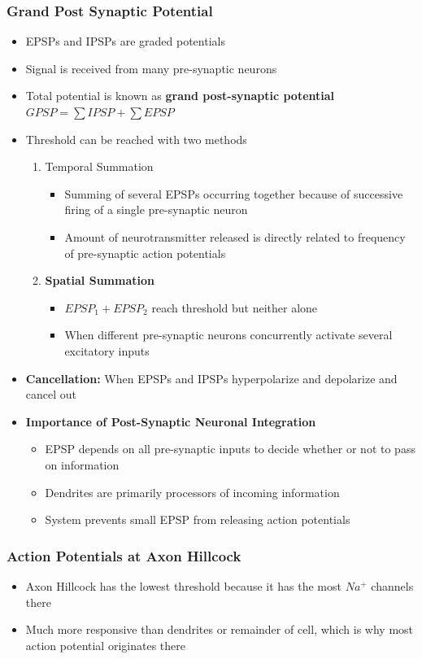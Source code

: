 \documentclass[11pt]{article}
\begin{document}
\subsubsection{Grand Post Synaptic Potential}
\begin{itemize}
\item EPSPs and IPSPs are graded potentials
\item Signal is received from many pre-synaptic neurons
\item Total potential is known as \textbf{grand post-synaptic potential} $GPSP = \sum IPSP + \sum EPSP$
\item Threshold can be reached with two methods
\begin{enumerate}
\item Temporal Summation
\begin{itemize}
\item Summing of several EPSPs occurring together because of successive firing of a single pre-synaptic neuron 
\item Amount of neurotransmitter released is directly related to frequency of pre-synaptic action potentials
\end{itemize}
\item \textbf{Spatial Summation }
\begin{itemize}
\item $EPSP_1 + EPSP_2$ reach threshold but neither alone
\item When different pre-synaptic  neurons concurrently activate several excitatory inputs
\end{itemize}
\end{enumerate}
\item \textbf{Cancellation: } When EPSPs and IPSPs hyperpolarize and depolarize and cancel out
\item \textbf{Importance of Post-Synaptic Neuronal Integration}
\begin{itemize}
\item EPSP depends on all pre-synaptic inputs to decide whether or not to pass on information
\item Dendrites are primarily processors of incoming information
\item System prevents small EPSP from releasing action potentials
\end{itemize}
\end{itemize}

\subsubsection{Action Potentials at Axon Hillcock}
\begin{itemize}
\item Axon Hillcock has the lowest threshold because it has the most $Na^+$ channels there
\item Much more responsive than dendrites or remainder of cell, which is why most action potential originates there
\end{itemize}
\end{document}
